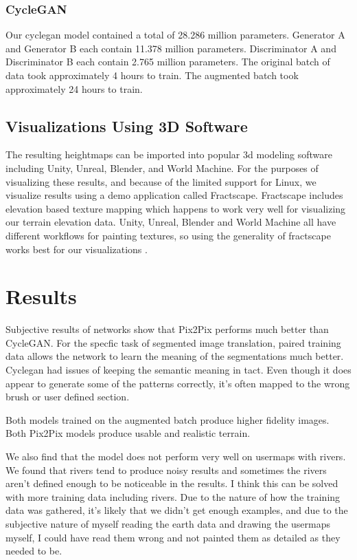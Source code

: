 \documentclass[twocolumn]{article}
\begin{document}
	\subsubsection{CycleGAN}
		Our cyclegan model contained a total of 28.286 million parameters. Generator A and Generator B each contain 11.378 million parameters. Discriminator A and Discriminator B each contain 2.765 million parameters. The original batch of data took approximately 4 hours to train. The augmented batch took approximately 24 hours to train.

	\subsection{Visualizations Using 3D Software}
	
	The resulting heightmaps can be imported into popular 3d modeling software including Unity, Unreal, Blender, and World Machine. For the purposes of visualizing these results, and because of the limited support for Linux, we visualize results using a demo application called Fractscape. Fractscape includes elevation based texture mapping which happens to work very well for visualizing our terrain elevation data. Unity, Unreal, Blender and World Machine all have different workflows for painting textures, so using the generality of fractscape works best for our visualizations \cite{starscenesoftware2006}.

	\section{Results}
	
	Subjective results of networks show that Pix2Pix performs much better than CycleGAN. For the specfic task of segmented image translation, paired training data allows the network to learn the meaning of the segmentations much better. Cyclegan had issues of keeping the semantic meaning in tact. Even though it does appear to generate some of the patterns correctly, it's often mapped to the wrong brush or user defined section.
	
	Both models trained on the augmented batch produce higher fidelity images. Both Pix2Pix models produce usable and realistic terrain.
	
	We also find that the model does not perform very well on usermaps with rivers. We found that rivers tend to produce noisy results and sometimes the rivers aren't defined enough to be noticeable in the results. I think this can be solved with more training data including rivers. Due to the nature of how the training data was gathered, it's likely that we didn't get enough examples, and due to the subjective nature of myself reading the earth data and drawing the usermaps myself, I could have read them wrong and not painted them as detailed as they needed to be.
\end{document}
